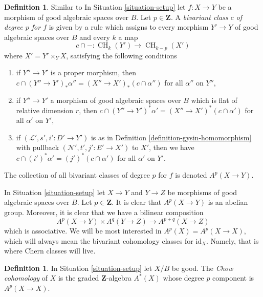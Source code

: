\documentclass{stacks-project}
\newenvironment{reference}{\comment}{\endcomment}
\theoremstyle{plain}
\theoremstyle{definition}
\newtheorem{definition}[subsection]{Definition}
\theoremstyle{remark}
\numberwithin{equation}{subsection}
\def\CH{\mathop{\mathrm{CH}}\nolimits}
\begin{document}
\begin{definition}
\label{definition-bivariant-class}
\begin{reference}
Similar to \cite[Definition 17.1]{F}
\end{reference}
In Situation \ref{situation-setup} let $f : X \to Y$ be a morphism of
good algebraic spaces over $B$. Let $p \in \mathbf{Z}$.
A {\it bivariant class $c$ of degree $p$ for $f$} is given by a rule
which assigns to every morphism $Y' \to Y$ of good algebraic spaces over $B$
and every $k$ a map
$$
c \cap - : \CH_k(Y') \longrightarrow \CH_{k - p}(X')
$$
where $X' = Y' \times_Y X$, satisfying the following conditions
\begin{enumerate}
\item if $Y'' \to Y'$ is a proper morphism, then
$c \cap (Y'' \to Y')_*\alpha'' = (X'' \to X')_*(c \cap \alpha'')$
for all $\alpha''$ on $Y''$,
\item if $Y'' \to Y'$ a morphism of good algebraic spaces over $B$
which is flat of relative dimension $r$, then
$c \cap (Y'' \to Y')^*\alpha' = (X'' \to X')^*(c \cap \alpha')$
for all $\alpha'$ on $Y'$,
\item if $(\mathcal{L}', s', i' : D' \to Y')$ is as in
Definition \ref{definition-gysin-homomorphism}
with pullback $(\mathcal{N}', t', j' : E' \to X')$ to $X'$,
then we have $c \cap (i')^*\alpha' = (j')^*(c \cap \alpha')$
for all $\alpha'$ on $Y'$.
\end{enumerate}
The collection of all bivariant classes of degree $p$ for $f$ is
denoted $A^p(X \to Y)$.
\end{definition}

\noindent
In Situation \ref{situation-setup} let $X \to Y$ and $Y \to Z$
be morphisms of good algebraic spaces over $B$. Let $p \in \mathbf{Z}$.
It is clear that $A^p(X \to Y)$ is an abelian group.
Moreover, it is clear that we have a bilinear composition
$$
A^p(X \to Y) \times A^q(Y \to Z) \to A^{p + q}(X \to Z)
$$
which is associative.
We will be most interested in $A^p(X) = A^p(X \to X)$, which will always mean
the bivariant cohomology classes for $\text{id}_X$. Namely, that is where
Chern classes will live.

\begin{definition}
\label{definition-chow-cohomology}
In Situation \ref{situation-setup} let $X/B$ be good. The {\it Chow cohomology}
of $X$ is the graded $\mathbf{Z}$-algebra $A^*(X)$ whose degree
$p$ component is $A^p(X \to X)$.
\end{definition}
\end{document}
